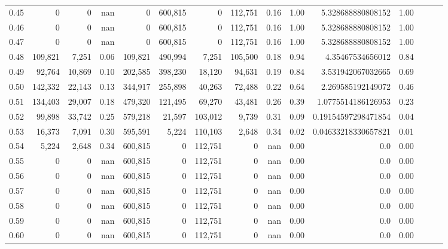 \begin{tabular}{rrrrrrrrrrrrrrr}
0.45 &        0 &       0 &   nan &        0 &  600,815 &        0 &  112,751 &  0.16 &  1.00 &    5.328688880808152 &      1.00 \\
0.46 &        0 &       0 &   nan &        0 &  600,815 &        0 &  112,751 &  0.16 &  1.00 &    5.328688880808152 &      1.00 \\
0.47 &        0 &       0 &   nan &        0 &  600,815 &        0 &  112,751 &  0.16 &  1.00 &    5.328688880808152 &      1.00 \\
0.48 &  109,821 &   7,251 &  0.06 &  109,821 &  490,994 &    7,251 &  105,500 &  0.18 &  0.94 &     4.35467534656012 &      0.84 \\
0.49 &   92,764 &  10,869 &  0.10 &  202,585 &  398,230 &   18,120 &   94,631 &  0.19 &  0.84 &    3.531942067032665 &      0.69 \\
0.50 &  142,332 &  22,143 &  0.13 &  344,917 &  255,898 &   40,263 &   72,488 &  0.22 &  0.64 &    2.269585192149072 &      0.46 \\
0.51 &  134,403 &  29,007 &  0.18 &  479,320 &  121,495 &   69,270 &   43,481 &  0.26 &  0.39 &   1.0775514186126953 &      0.23 \\
0.52 &   99,898 &  33,742 &  0.25 &  579,218 &   21,597 &  103,012 &    9,739 &  0.31 &  0.09 &  0.19154597298471854 &      0.04 \\
0.53 &   16,373 &   7,091 &  0.30 &  595,591 &    5,224 &  110,103 &    2,648 &  0.34 &  0.02 &  0.04633218330657821 &      0.01 \\
0.54 &    5,224 &   2,648 &  0.34 &  600,815 &        0 &  112,751 &        0 &   nan &  0.00 &                  0.0 &      0.00 \\
0.55 &        0 &       0 &   nan &  600,815 &        0 &  112,751 &        0 &   nan &  0.00 &                  0.0 &      0.00 \\
0.56 &        0 &       0 &   nan &  600,815 &        0 &  112,751 &        0 &   nan &  0.00 &                  0.0 &      0.00 \\
0.57 &        0 &       0 &   nan &  600,815 &        0 &  112,751 &        0 &   nan &  0.00 &                  0.0 &      0.00 \\
0.58 &        0 &       0 &   nan &  600,815 &        0 &  112,751 &        0 &   nan &  0.00 &                  0.0 &      0.00 \\
0.59 &        0 &       0 &   nan &  600,815 &        0 &  112,751 &        0 &   nan &  0.00 &                  0.0 &      0.00 \\
0.60 &        0 &       0 &   nan &  600,815 &        0 &  112,751 &        0 &   nan &  0.00 &                  0.0 &      0.00 \\

\end{tabular}

